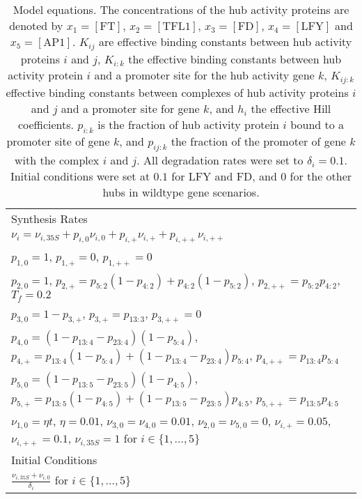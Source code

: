 \begin{table*}[!htbp]
\begin{tabular}{@{}l}
Synthesis Rates \\
$\nu_i=\nu_{i,\mathrm 35S} + p_{i,0} \nu_{i,0} + p_{i,+} \nu_{i,+} + p_{i,++} \nu_{i,++}$\\
$p_{1,0}= 1$, $p_{1,+} = 0$, $p_{1,++} = 0$\\
$p_{2,0}= 1$, $p_{2,+} = p_{5:2}(1 - p_{4:2}) + p_{4:2}(1 - p_{5:2})$, $p_{2,++}= p_{5:2} p_{4:2}$, $T_f=0.2$\\
$p_{3,0}=1-p_{3,+}$, $p_{3,+}=p_{13:3}$,  $p_{3,++}=0$\\
$p_{4,0} = (1-p_{13:4} - p_{23:4}) (1 - p_{5:4})$, $p_{4,+} = p_{13:4} (1-p_{5:4}) + (1-p_{13:4} - p_{23:4}) p_{5:4}$, $p_{4,++} = p_{13:4} p_{5:4}$\\
$p_{5,0} = (1-p_{13:5} - p_{23:5}) (1 - p_{4:5})$, $p_{5,+} = p_{13:5} (1-p_{4:5}) + (1-p_{13:5} - p_{23:5}) p_{4:5}$, $p_{5,++} = p_{13:5} p_{4:5}$\\
$\nu_{1,0} = {\eta} t$, $\eta=0.01$, $\nu_{3,0} = \nu_{4,0} = 0.01$, $\nu_{2,0} = \nu_{5,0} = 0$, $\nu_{i,+}=0.05$, $\nu_{i,++} =0.1$, $\nu_{i,35S} = 1$ for $i\in\{1,\ldots,5\}$\\ 
\midrule
Initial Conditions \\
$\displaystyle\frac{\nu_{i,35S} + \nu_{i,0}}{\delta_i} $ for $i\in\{1,\ldots,5\}$\\
\bottomrule
\end{tabular}
\caption{Model equations.
  The concentrations of the hub activity proteins are denoted by $x_1=[\mathrm{FT}]$, $x_2=[\mathrm{TFL1}]$, $x_3=[\mathrm{FD}]$, $x_4=[\mathrm{LFY}]$ and $x_5=[\mathrm{AP1}]$.
$K_{ij}$ are effective binding constants between hub activity proteins $i$ and $j$, 
$K_{i:k}$ the effective binding constants between hub activity protein $i$ and a promoter site for the hub activity gene $k$, $K_{ij:k}$ effective binding constants between complexes of hub activity proteins $i$ and $j$ and a promoter site for gene $k$, and $h_i$ the effective Hill coefficients.
$p_{i:k}$ is the fraction of hub activity protein $i$ bound to a promoter site of gene $k$, and $p_{ij:k}$ the fraction of the promoter of gene $k$ with the complex $i$ and $j$.
All degradation rates were set to $\delta_i=0.1$.
Initial conditions were set at $0.1$ for LFY and FD, and $0$ for the other hubs in wildtype gene scenarios.
}
\label{tab:modelEquations}
\end{table*}

